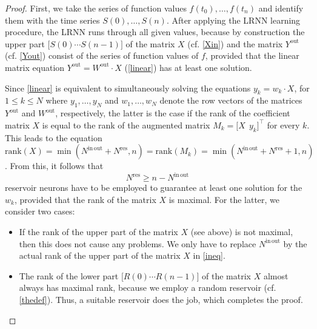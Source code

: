 \documentclass[twoside,11pt]{article}
\theoremstyle{definition}
\begin{document}
\begin{proof}
First, we take the series of function values $f(t_0),\dots,f(t_n)$ and identify
them with the time series $S(0),\dots,S(n)$. After applying the LRNN learning
procedure, the LRNN runs through all given values, because by construction the
upper part $\big[ S(0) \cdots S(n-1) \big]$ of the matrix $X$ (cf. \cref{Xin})
and the matrix $Y^\mathrm{out}$ (cf. \cref{Yout}) consist of the series of
function values of $f$, provided that the linear
matrix equation $Y^\mathrm{out} = W^\mathrm{out} \cdot X$ (\cref{linear}) has at
least one solution.

Since \cref{linear} is equivalent to simultaneously solving the equations $y_k =
w_k \cdot X$, for $1 \le k \le N$ where $y_1,\dots,y_N$ and $w_1,\dots,w_N$
denote the row vectors of the matrices $Y^\mathrm{out}$ and $W^\mathrm{out}$,
respectively, the latter is the case if the rank of the coefficient matrix $X$
is equal to the rank of the augmented matrix $M_k = \big[ X ~~ y_k \big]^\top$
for every $k$. This leads to the equation $\mathrm{rank}(X) =
\min(N^\mathrm{in\,out}+N^\mathrm{res},n) = \mathrm{rank}(M_k) =
\min(N^\mathrm{in\,out}+N^\mathrm{res}+1,n)$. From this, it follows that
\begin{equation}\label{ineq}
	N^\mathrm{res} \ge n-N^\mathrm{in\,out}
\end{equation}
reservoir neurons have to be employed to guarantee at least one solution for the
$w_k$, provided that the rank of the matrix $X$ is maximal. For the latter, we
consider two cases:
\begin{itemize}
  \item If the rank of the upper part of the matrix $X$ (see above) is not
	maximal, then this does not cause any problems. We only have to replace
	$N^\mathrm{in\,out}$ by the actual rank of the upper part of the matrix
	$X$ in \cref{ineq}.
  \item The rank of the lower part $\big[ R(0) \cdots R(n-1) \big]$ of the
	matrix $X$ almost always has maximal rank, because we employ a random
	reservoir (cf. \cref{thedef}). Thus, a suitable reservoir does the job,
	which completes the proof.
\end{itemize}
\vspace*{-5ex} %
\end{proof}
\end{document}

